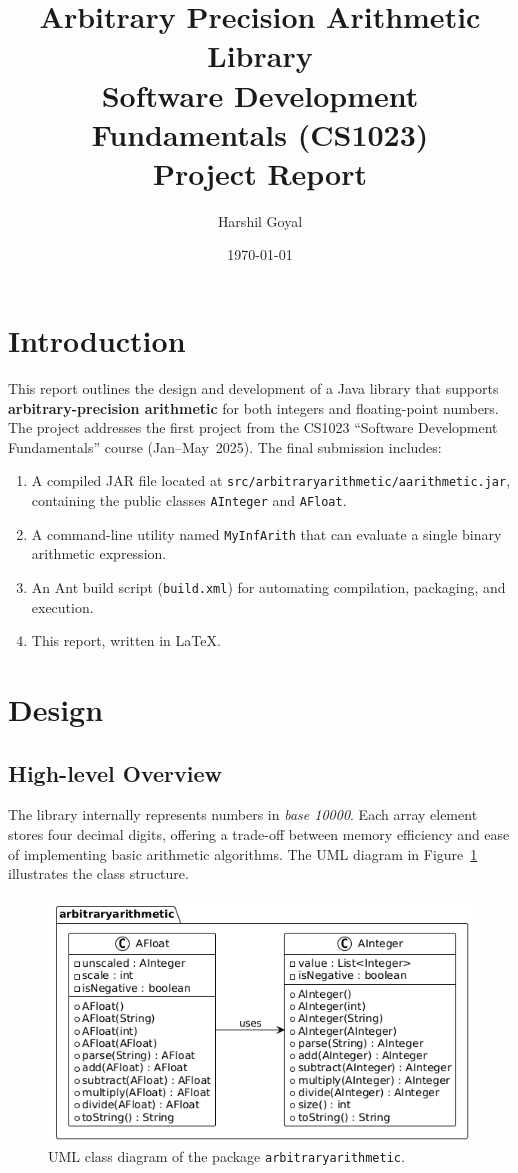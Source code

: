 \documentclass[12pt]{article}
\title{Arbitrary Precision Arithmetic Library\\Software Development Fundamentals (CS1023)\\\vspace{0.5em}Project Report}
\author{Harshil Goyal}
\date{\today}
\begin{document}
\maketitle
\tableofcontents
\newpage

\section{Introduction}
This report outlines the design and development of a Java library that supports \textbf{arbitrary-precision arithmetic} for both integers and floating-point numbers. The project addresses the first project from the CS1023 “Software Development Fundamentals” course (Jan–May~2025). The final submission includes:

\begin{enumerate}[label=\arabic*.]
  \item A compiled JAR file located at \texttt{src/arbitraryarithmetic/aarithmetic.jar}, containing the public classes \texttt{AInteger} and \texttt{AFloat}.
  \item A command-line utility named \texttt{MyInfArith} that can evaluate a single binary arithmetic expression.
  \item An Ant build script (\texttt{build.xml}) for automating compilation, packaging, and execution.
  \item This report, written in \LaTeX.
\end{enumerate}

\section{Design}
\subsection{High-level Overview}
The library internally represents numbers in \emph{base 10000}. Each array element stores four decimal digits, offering a trade-off between memory efficiency and ease of implementing basic arithmetic algorithms. The UML diagram in Figure~\ref{fig:uml} illustrates the class structure.

\begin{figure}[h]
  \centering
  \includegraphics[width=0.9\linewidth]{uml_sdf1.png}
  \caption{UML class diagram of the package \texttt{arbitraryarithmetic}.}
  \label{fig:uml}
\end{figure}
\end{document}
